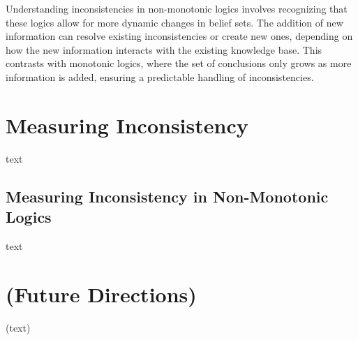 Understanding inconsistencies in non-monotonic logics involves recognizing that these logics allow for more dynamic changes in belief sets.
The addition of new information can resolve existing inconsistencies or create new ones, depending on how the new information interacts with the existing knowledge base.
This contrasts with monotonic logics, where the set of conclusions only grows as more information is added, ensuring a predictable handling of inconsistencies.

\section{Measuring Inconsistency}
text

\subsection{Measuring Inconsistency in Non-Monotonic Logics}
text

\section{(Future Directions)}
 (text)
